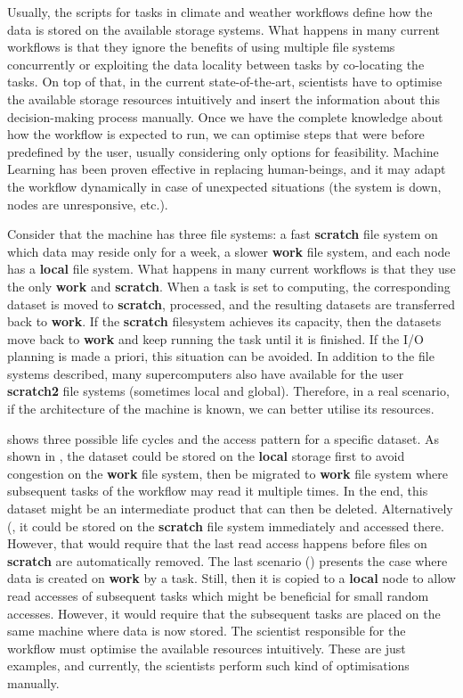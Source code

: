 \documentclass{superfri}
\begin{document}
Usually, the scripts for tasks in climate and weather workflows define how the data is stored on the available storage systems.
What happens in many current workflows is that they ignore the benefits of using multiple file systems concurrently or exploiting the data locality between tasks by co-locating the tasks.
On top of that, in the current state-of-the-art, scientists have to optimise the available storage resources intuitively and insert the information about this decision-making process manually.
Once we have the complete knowledge about how the workflow is expected to run, we can optimise steps that were before predefined by the user, usually considering only options for feasibility. Machine Learning has been proven effective in replacing human-beings, and it may adapt the workflow dynamically in case of unexpected situations (the system is down, nodes are unresponsive, etc.).

Consider that the machine has three file systems: a fast \textbf{scratch} file system on which data may reside only for a week, a slower \textbf{work} file system, and each node has a \textbf{local} file system.
What happens in many current workflows is that they use the only \textbf{work} and \textbf{scratch}.
When a task is set to computing, the corresponding dataset is moved to \textbf{scratch}, processed, and the resulting datasets are transferred back to \textbf{work}.
If the \textbf{scratch} filesystem achieves its capacity, then the datasets move back to \textbf{work} and keep running the task until it is finished.
If the I/O planning is made a priori, this situation can be avoided.
In addition to the file systems described, many supercomputers also have available for the user \textbf{scratch2} file systems (sometimes local and global).
Therefore, in a real scenario, if the architecture of the machine is known, we can better utilise its resources.

 shows three possible life cycles and the access pattern for a specific dataset.
As shown in , the dataset could be stored on the \textbf{local} storage first to avoid congestion on the \textbf{work} file system, then be migrated to \textbf{work} file system where subsequent tasks of the workflow may read it multiple times.
In the end, this dataset might be an intermediate product that can then be deleted.
Alternatively (, it could be stored on the \textbf{scratch} file system immediately and accessed there.
However, that would require that the last read access happens before files on \textbf{scratch} are automatically removed.
The last scenario () presents the case where data is created on \textbf{work} by a task. Still, then it is copied to a \textbf{local} node to allow read accesses of subsequent tasks which might be beneficial for small random accesses.
However, it would require that the subsequent tasks are placed on the same machine where data is now stored.
The scientist responsible for the workflow must optimise the available resources intuitively.
These are just examples, and currently, the scientists perform such kind of optimisations manually.
\end{document}

